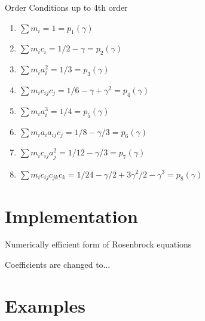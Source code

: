 \documentclass[serif]{beamer}
\begin{document}
\begin{frame}{Order Conditions up to 4th order}
  \begin{enumerate}
  \item<1-> $\sum m_i = 1 = p_1\left(\gamma\right)$
  \vfill
  \item<1-> $\sum m_ic_i = 1/2 - \gamma = p_2\left(\gamma\right)$
  \vfill
  \item<1-> $\sum m_ia_i^2 = 1/3 = p_3\left(\gamma\right)$
  \vfill
  \item<1-> $\sum m_ic_{ij}c_j = 1/6 - \gamma + \gamma^2 = p_4\left(\gamma\right)$
  \vfill
  \item<1-> $\sum m_ia_i^3 = 1/4 = p_5\left(\gamma\right)$
  \vfill
  \item<1-> $\sum m_ia_ia_{ij}c_j = 1/8 - \gamma/3 = p_6\left(\gamma\right)$
  \vfill
  \item<1-> $\sum m_ic_{ij}a_j^2 = 1/12 - \gamma/3 = p_7\left(\gamma\right)$
  \vfill
  \item<1-> $\sum m_ic_{ij}c_{jk}c_{k} = 1/24 - \gamma/2 + 3\gamma^2/2 - \gamma^3 = p_8\left(\gamma\right)$
  \end{enumerate}
\end{frame}

\section{Implementation}

\begin{frame}{Numerically efficient form of Rosenbrock equations}
 
\end{frame}

\begin{frame}{Coefficients are changed to...}

\end{frame}

\section{Examples}
\end{document}
